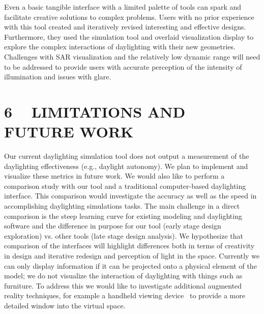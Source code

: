 \documentclass{article}
\begin{document}
Even a basic tangible interface with a limited palette of tools can
spark and facilitate creative solutions to complex problems.  Users
with no prior experience with this tool created and iteratively
revised interesting and effective designs.  Furthermore, they used the
simulation tool and overlaid visualization display to explore the
complex interactions of daylighting with their new geometries.
Challenges with SAR visualization and the relatively low dynamic range
will need to be addressed to provide users with accurate perception of
the intensity of illumination and issues with glare.


%










\section{6 ~ LIMITATIONS AND FUTURE WORK}

Our current daylighting simulation tool does not output a measurement
of the daylighting effectiveness (e.g., daylight autonomy).
We plan to implement and visualize these metrics in future work.  We
would also like to perform a comparison study with our tool and a
traditional computer-based daylighting interface.  This comparison
would investigate the accuracy as well as the speed in accomplishing
daylighting simulations tasks.  The main challenge in a direct
comparison is the steep learning curve for existing modeling and
daylighting software and the difference in purpose for our tool (early
stage design exploration) vs. other tools (late stage design
analysis).  We hypothesize that comparison of the interfaces will
highlight differences both in terms of creativity in design and
iterative redesign and perception of light in the space.
%
Currently we can only display information if it can be projected onto
a physical element of the model; we do not visualize the interaction
of daylighting with things such as furniture.
%
To address this we would like to investigate additional augmented
reality techniques, for example a handheld viewing
device~\cite{Ishii97tangiblebits,642613,1517704} to provide a more
detailed window into the virtual space.
\end{document}
